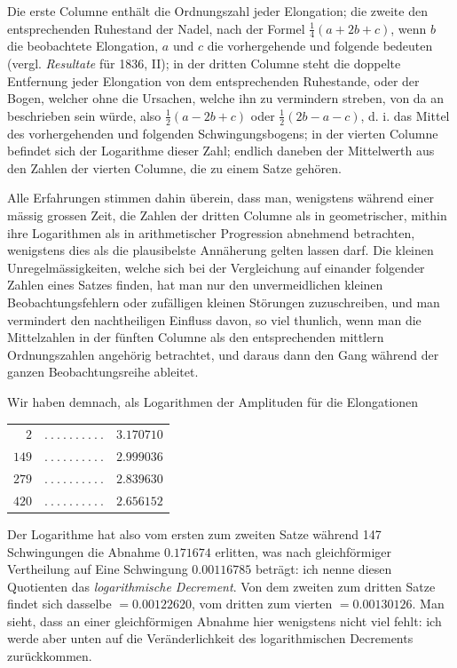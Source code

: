 Die erste Columne enthält die Ordnungszahl jeder Elongation; die zweite den entsprechenden Ruhestand der Nadel, nach der Formel $\tfrac14(a+2b+c)$, wenn $b$ die beobachtete Elongation, $a$ und $c$ die vorhergehende und folgende bedeuten (vergl. \textit{Resultate} für 1836, II); in der dritten Columne steht die doppelte Entfernung jeder Elongation von dem entsprechenden Ruhestande, oder der Bogen, welcher ohne die Ursachen, welche ihn zu vermindern streben, von da an beschrieben sein würde, also $\tfrac12(a-2b+c)$ oder $\tfrac12(2b-a-c)$, d. i. das Mittel des vorhergehenden und folgenden Schwingungsbogens; in der vierten Columne befindet sich der Logarithme dieser Zahl; endlich daneben der Mittelwerth aus den Zahlen der vierten Columne, die zu einem Satze gehören.

Alle Erfahrungen stimmen dahin überein, dass man, wenigstens während einer mässig grossen Zeit, die Zahlen der dritten Columne als in geometrischer,
mithin ihre Logarithmen als in arithmetischer Progression abnehmend betrachten, wenigstens dies als die plausibelste Annäherung gelten lassen darf. Die kleinen Unregelmässigkeiten, welche sich bei der Vergleichung auf einander folgender Zahlen eines Satzes finden, hat man nur den unvermeidlichen kleinen Beobachtungsfehlern oder zufälligen kleinen Störungen zuzuschreiben, und man vermindert den nachtheiligen Einfluss davon, so viel thunlich, wenn man die Mittelzahlen in der fünften Columne als den entsprechenden mittlern Ordnungszahlen angehörig betrachtet, und daraus dann den Gang während der ganzen Beobachtungsreihe ableitet.

Wir haben demnach, als Logarithmen der Amplituden für die Elongationen
\begin{center}
\begin{tabular}{rcl}
$2$ & $.\ .\ .\ .\ .\ .\ .\ .\ .\ .$ & $3.170710$\\
$149$ & $.\ .\ .\ .\ .\ .\ .\ .\ .\ .$ & $2.999036$\\
$279$ & $.\ .\ .\ .\ .\ .\ .\ .\ .\ .$ & $2.839630$\\
$420$ & $.\ .\ .\ .\ .\ .\ .\ .\ .\ .$ & $2.656152$
\end{tabular}
\end{center}

Der Logarithme hat also vom ersten zum zweiten Satze während 147 Schwingungen die Abnahme $0.171674$ erlitten, was nach gleichförmiger Vertheilung auf Eine Schwingung $0.00116785$ beträgt: ich nenne diesen Quotienten das \textit{logarithmische Decrement}. Von dem zweiten zum dritten Satze findet sich dasselbe $=0.00122620$, vom dritten zum vierten $=0.00130126$. Man sieht, dass an einer gleichförmigen Abnahme hier wenigstens nicht viel fehlt: ich werde aber unten auf die Veränderlichkeit des logarithmischen Decrements zurückkommen.

